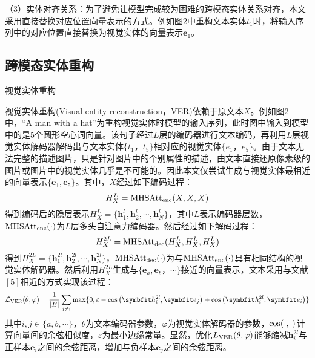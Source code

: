 （3）{\sffamily 实体对齐关系：}为了避免让模型完成较为困难的跨模态实体关系对齐，本文采用直接替换对应位置向量表示的方式。例如图2中重构文本实体$t_1$时，将输入序列中的对应位置直接替换为视觉实体的向量表示${\boldsymbol{e}_1}$。

\subsection{跨模态实体重构}
{\sffamily 视觉实体重构}

视觉实体重构(Visual entity reconstruction，VER)依赖于原文本$X$。例如图2中，“A man with a hat”为重构视觉实体时模型的输入序列，此时图中输入到模型中的是5个圆形空心词向量。该句子经过$L$层的编码器进行文本编码，再利用$L$层视觉实体解码器解码出与文本实体$\{t_1，t_5\}$相对应的视觉实体$\{e_1，e_5\}$。由于文本无法完整的描述图片，只是针对图片中的个别属性的描述，由文本直接还原像素级的图片或图片中的视觉实体几乎是不可能的。因此本文仅尝试生成与视觉实体最相近的向量表示$\{{\boldsymbol{e}_1},{\boldsymbol{e}_5}\}$。其中，$X$经过如下编码过程：
\begin{equation}
H_X^L={\rm{MHSAtt_{enc}}}(X, X, X)
\end{equation}
得到编码后的隐层表示$H_X^L=\{{\boldsymbol{h}_1^l},{\boldsymbol{h}_2^l},\cdots,{\boldsymbol{h}_N^l}\}$，其中$L$表示编码器层数，${\rm MHSAtt_{enc}}(\cdot)$为$L$层多头自注意力编码器。然后经过如下解码过程：
\begin{equation}
H_X^{2L}={\rm{MHSAtt_{dec}}}(H_X^L, H_X^L, H_X^L)
\end{equation}
得到$H_X^{2L}=\{{\boldsymbol{h}_1^{2l}},{\boldsymbol{h}_2^{2l}},\cdots,{\boldsymbol{h}_N^{2l}}\}$，${\rm MHSAtt_{dec}}(\cdot)$为与${\rm MHSAtt_{enc}}(\cdot)$具有相同结构的视觉实体解码器。然后利用$H_X^{2L}$生成与$\{{\boldsymbol{e}_a},{\boldsymbol{e}_b}，\cdots\}$接近的向量表示，文本采用与文献${[5]}$相近的方式实现该过程：
\begin{equation}
\mathcal{L}_{\rm{VER}}(\theta, \varphi)=
    \frac{1}{{\vert}E{\vert}}
    \mathop{\sum}_{j{\neq}i} {\max}\{0, \varepsilon - {\rm{cos}}\left( {\boldsymbol h_i^{2l}}, {\boldsymbol e_j} \right) + {\rm{cos}}\left( {\boldsymbol h_i^{2l}}, {\boldsymbol e_i} \right)\}
\end{equation}
%
其中$i,j{\in}\{a,b,\cdots\}$，$\theta$为文本编码器参数，$\varphi$为视觉实体解码器的参数，${\rm{cos}}(\cdot,\cdot)$计算向量间的余弦相似度，$\varepsilon$为最小边缘常量。显然，优化$L_{\rm{VER}}(\theta,\varphi)$能够缩减${\boldsymbol{h}_i^{2l}}$与正样本${\boldsymbol{e}_i}$之间的余弦距离，增加与负样本${\boldsymbol{e}_j}$之间的余弦距离。


